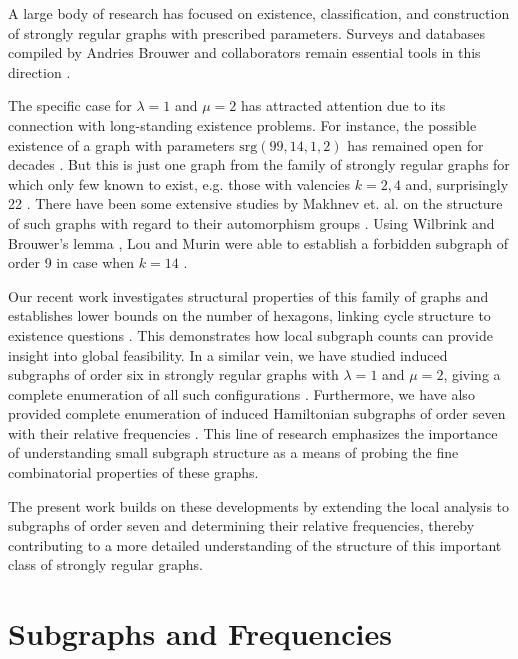 \documentclass[12pt]{article} %
\begin{document}
A large body of research has focused on existence, classification, and construction of strongly regular graphs with prescribed parameters. Surveys and databases compiled by Andries Brouwer and collaborators remain essential tools in this direction \cite{Brouwer}.

The specific case for $\lambda = 1$ and $\mu = 2$ has attracted attention due to its connection with long-standing existence problems. For instance, the possible existence of a graph with parameters $\mathrm{srg}(99,14,1,2)$ has remained open for decades \cite{Conway}. But this is just one graph from the family of strongly regular graphs for which only few known to exist, e.g. those with valencies $k=2, 4$ and, surprisingly 22 \cite{Berlekamp}. There have been some extensive studies by Makhnev et. al. on the structure of such graphs with regard to their automorphism groups \cite{MakhnevMinkova}. Using Wilbrink and Brouwer's lemma \cite{WilbrinkBrouwer}, Lou and Murin were able to establish a forbidden subgraph of order 9 in case when $k=14$ \cite{LouMurin}. 


Our recent work investigates structural properties of this family of graphs and establishes lower bounds on the number of hexagons, linking cycle structure to existence questions \cite{ReiLowerBound}. This demonstrates how local subgraph counts can provide insight into global feasibility.
In a similar vein, we have studied induced subgraphs of order six in strongly regular graphs with $\lambda = 1$ and $\mu = 2$, giving a complete enumeration of all such configurations \cite{ReiAllSix}. Furthermore, we have also provided complete enumeration of induced Hamiltonian subgraphs of order seven with their relative frequencies \cite{ReiHamiltonianSeven}. This line of research emphasizes the importance of understanding small subgraph structure as a means of probing the fine combinatorial properties of these graphs. 

The present work builds on these developments by extending the local analysis to subgraphs of order seven and determining their relative frequencies, thereby contributing to a more detailed understanding of the structure of this important class of strongly regular graphs.



\section{Subgraphs and Frequencies}
\end{document}
